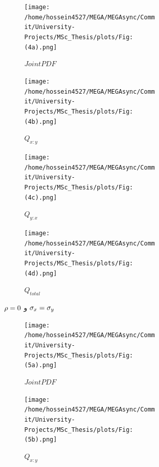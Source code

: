 \documentclass[a4paper,titlepage,12pt,fleqn,oneside]{report}
\begin{document}
	\begin{figure}[tbp]
		\centering
		\begin{subfigure}[b]{\textwidth}
			\renewcommand\thesubfigure{a}
			\begin{subfigure}[b]{0.24\textwidth}
				\renewcommand\thesubfigure{i}
				\centering
				\texttt{[image: /home/hossein4527/MEGA/MEGAsync/Commit/University-Projects/MSc\_Thesis/plots/Fig:(4a).png]}
				\caption{$Joint PDF$}
				\label{fig:2.1.1}
			\end{subfigure}
			\hfill
			\begin{subfigure}[b]{0.24\textwidth}
				\renewcommand\thesubfigure{ii}
				\centering
				\texttt{[image: /home/hossein4527/MEGA/MEGAsync/Commit/University-Projects/MSc\_Thesis/plots/Fig:(4b).png]}
				\caption{$Q_{x:y}$}
				\label{fig:2.1.2}
			\end{subfigure}
			\hfill
			\begin{subfigure}[b]{0.24\textwidth}
				\renewcommand\thesubfigure{iii}
				\centering
				\texttt{[image: /home/hossein4527/MEGA/MEGAsync/Commit/University-Projects/MSc\_Thesis/plots/Fig:(4c).png]}
				\caption{$Q_{y:x}$}
				\label{fig:2.1.3}
			\end{subfigure}
			\hfill
			\begin{subfigure}[b]{0.24\textwidth}
				\renewcommand\thesubfigure{iv}
				\centering
				\texttt{[image: /home/hossein4527/MEGA/MEGAsync/Commit/University-Projects/MSc\_Thesis/plots/Fig:(4d).png]}
				\caption{$Q_{total}$}
				\label{fig:2.1.4}
			\end{subfigure}
			\caption{$\protect\rho =0$ و $\protect\sigma _{x}=\protect\sigma _{y}$}
			\label{fig:2.1}
		\end{subfigure}
		\begin{subfigure}[b]{\textwidth}
			\renewcommand\thesubfigure{b}
			\begin{subfigure}[b]{0.24\textwidth}
				\renewcommand\thesubfigure{i}
				\centering
				\texttt{[image: /home/hossein4527/MEGA/MEGAsync/Commit/University-Projects/MSc\_Thesis/plots/Fig:(5a).png]}
				\caption{$Joint PDF$}
				\label{fig:2.2.1}
			\end{subfigure}
			\hfill
			\begin{subfigure}[b]{0.24\textwidth}
				\renewcommand\thesubfigure{ii}
				\centering
				\texttt{[image: /home/hossein4527/MEGA/MEGAsync/Commit/University-Projects/MSc\_Thesis/plots/Fig:(5b).png]}
				\caption{$Q_{x:y}$}
				\label{fig:2.2.2}
			\end{subfigure}
			\hfill
			\begin{subfigure}[b]{0.24\textwidth}

\end{subfigure}
\end{subfigure}
\end{figure}
\end{document}
